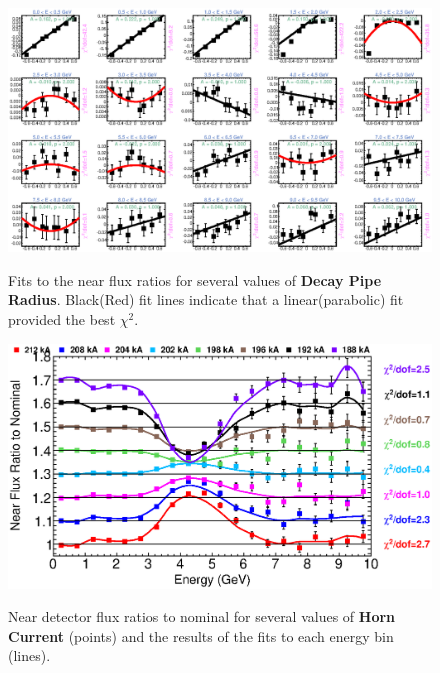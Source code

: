 \begin{figure}[ht]
  \begin{center}
    {\includegraphics[width=5.0in]{figures/DecayPipeRadius_near_fits.eps}}
  \end{center}
\caption{ Fits to the near flux ratios for several values of {\bf Decay Pipe Radius}. Black(Red) fit lines indicate that a linear(parabolic) fit provided the best $\chi^2$. }
\end{figure}

\begin{figure}[ht]
  \begin{center}
    {\includegraphics[width=6.0in]{figures/HornCurrent_near_summary.eps}}
  \end{center}
\caption{ Near detector flux ratios to nominal for several values of {\bf Horn Current} (points) and the results of the fits to each energy bin (lines).}
\end{figure}

